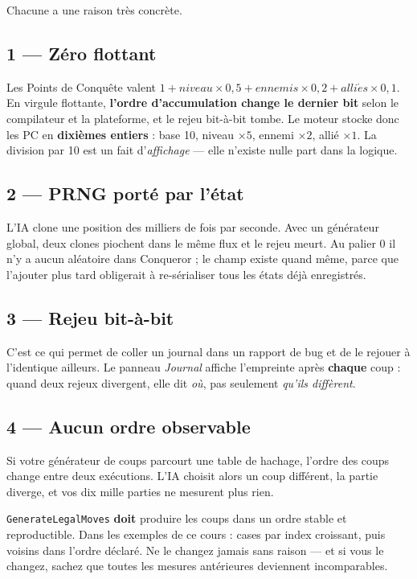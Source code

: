 Chacune a une raison très concrète.

\subsection*{1 — Zéro flottant}

Les Points de Conquête valent $1 + niveau \times 0{,}5 + ennemis \times 0{,}2 +
alli\acute{e}s \times 0{,}1$. En virgule flottante, \textbf{l'ordre
d'accumulation change le dernier bit} selon le compilateur et la plateforme, et
le rejeu bit-à-bit tombe. Le moteur stocke donc les PC en \textbf{dixièmes
entiers} : base 10, niveau $\times 5$, ennemi $\times 2$, allié $\times 1$. La
division par 10 est un fait d'\emph{affichage} — elle n'existe nulle part dans la
logique.

\subsection*{2 — PRNG porté par l'état}

L'IA clone une position des milliers de fois par seconde. Avec un générateur
global, deux clones piochent dans le même flux et le rejeu meurt. Au palier 0 il
n'y a aucun aléatoire dans Conqueror ; le champ existe quand même, parce que
l'ajouter plus tard obligerait à re-sérialiser tous les états déjà enregistrés.

\subsection*{3 — Rejeu bit-à-bit}

C'est ce qui permet de coller un journal dans un rapport de bug et de le rejouer
à l'identique ailleurs. Le panneau \emph{Journal} affiche l'empreinte après
\textbf{chaque} coup : quand deux rejeux divergent, elle dit \emph{où}, pas
seulement \emph{qu'ils diffèrent}.

\subsection*{4 — Aucun ordre observable}

Si votre générateur de coups parcourt une table de hachage, l'ordre des coups
change entre deux exécutions. L'IA choisit alors un coup différent, la partie
diverge, et vos dix mille parties ne mesurent plus rien.

\begin{nkretenir}
\texttt{GenerateLegalMoves} \textbf{doit} produire les coups dans un ordre stable
et reproductible. Dans les exemples de ce cours : cases par index croissant, puis
voisins dans l'ordre déclaré. Ne le changez jamais sans raison — et si vous le
changez, sachez que toutes les mesures antérieures deviennent incomparables.
\end{nkretenir}

